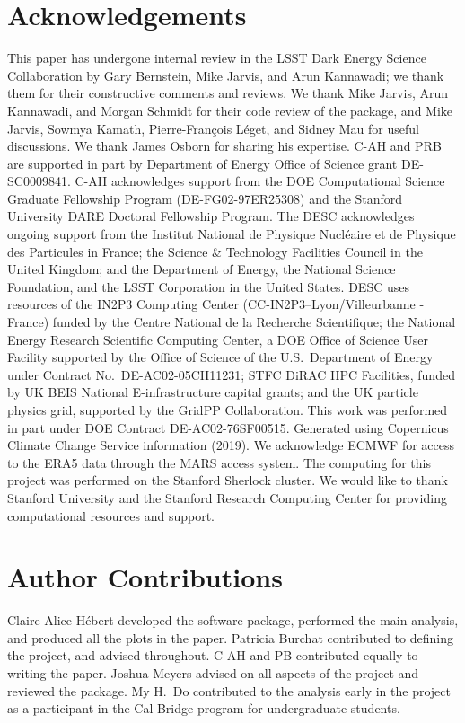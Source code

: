 \documentclass[twocolumn,twocolappendix]{openjournal}
\begin{document}
\section*{Acknowledgements} 
This paper has undergone internal review in the LSST Dark Energy Science Collaboration by Gary Bernstein, Mike Jarvis, and Arun Kannawadi; we thank them for their constructive comments and reviews. 
We thank Mike Jarvis, Arun Kannawadi, and Morgan Schmidt for their code review of the \psfws package, and Mike Jarvis, Sowmya Kamath, Pierre-François L\'eget, and Sidney Mau for useful discussions.
We thank James Osborn for sharing his expertise.
C-AH and PRB are supported in part by Department of Energy Office of Science grant DE-SC0009841.
C-AH acknowledges support from the DOE Computational Science Graduate Fellowship Program (DE-FG02-97ER25308) and the Stanford University DARE Doctoral Fellowship Program. 
The DESC acknowledges ongoing support from the Institut National de Physique Nucl\'eaire et de Physique des Particules in France; the Science \& Technology Facilities Council in the United Kingdom; and the Department of Energy, the National Science Foundation, and the LSST  Corporation in the United States.  
DESC uses resources of the IN2P3  Computing Center (CC-IN2P3--Lyon/Villeurbanne - France) funded by the Centre National de la Recherche Scientifique; the National Energy Research Scientific Computing Center, a DOE Office of Science User Facility supported by the Office of Science of the U.S.\ Department of Energy under Contract No.\ DE-AC02-05CH11231; STFC DiRAC HPC Facilities, funded by UK BEIS National E-infrastructure capital grants; and the UK particle physics grid, supported by the GridPP Collaboration.  
This work was performed in part under DOE Contract DE-AC02-76SF00515.
Generated using Copernicus Climate Change Service information (2019). 
We acknowledge ECMWF for access to the ERA5 data through the MARS access system.
The computing for this project was performed on the Stanford Sherlock cluster.
We would like to thank Stanford University and the Stanford Research Computing Center for providing computational resources and support. 

\section*{Author Contributions}

Claire-Alice H\'ebert developed the \psfws software package, performed the main analysis, and produced all the plots in the paper.
Patricia Burchat contributed to defining the project, and advised throughout.
C-AH and PB contributed equally to writing the paper. 
Joshua Meyers advised on all aspects of the project and reviewed the \psfws package.
My H.~Do contributed to the analysis early in the project as a participant in the Cal-Bridge program for undergraduate students.
\end{document}
